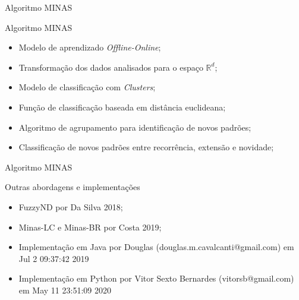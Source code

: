 \documentclass[aspectratio=43,10pt]{beamer}
\begin{document}
\begin{frame}[fragile]{Algoritmo MINAS}
  \begin{alertblock}{Algoritmo MINAS}
    \begin{itemize}%
      \item Modelo de aprendizado \textit{Offline-Online};
      \item Transformação dos dados analisados para o espaço $\mathbb{R}^d$;
      \item Modelo de classificação com \textit{Clusters};
      \item Função de classificação baseada em distância euclideana;
      \item Algoritmo de agrupamento para identificação de novos padrões;
      \item Classificação de novos padrões entre recorrência, extensão e novidade;
    \end{itemize}
  \end{alertblock}
\end{frame}

\begin{frame}[fragile]{Algoritmo MINAS}
  \begin{alertblock}{Outras abordagens e implementações}
    \begin{itemize}%
      \item FuzzyND por Da Silva 2018;
      \item Minas-LC e Minas-BR por Costa 2019;
      \item Implementação em Java por Douglas (douglas.m.cavalcanti@gmail.com) em Jul 2 09:37:42 2019
      \item Implementação em Python por Vitor Sexto Bernardes (vitorsb@gmail.com) em May 11 23:51:09 2020
    \end{itemize}
  \end{alertblock}
\end{frame}

\end{document}
